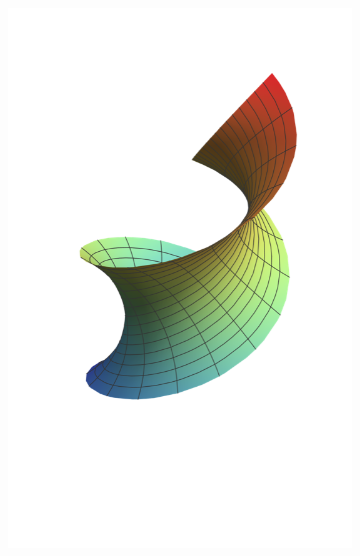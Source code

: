 \documentclass[spanish]{book}
\theoremstyle{definition}
\begin{document}
\begin{figure}[H]
\begin{subfigure}{.2\textwidth}
		\end{subfigure}
		\begin{subfigure}{.2\textwidth}
			\centering
			\includegraphics[width=\linewidth]{sup12}
		\end{subfigure}
		\begin{subfigure}{.125\textwidth}
			\centering

\end{subfigure}
\end{figure}
\end{document}
